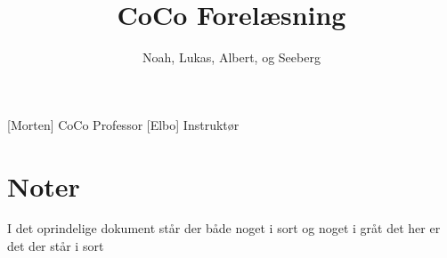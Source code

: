 \documentclass[a4paper,11pt]{article}
\title{CoCo Forelæsning}
\author{Noah, Lukas, Albert, og Seeberg}
\begin{document}
\maketitle

\begin{roles}
[Morten] CoCo Professor
[Elbo] Instruktør
\end{roles} 

\section*{Noter}
I det oprindelige dokument står der både noget i sort og noget i gråt det her er det der står i sort

\begin{props}
\prop{}
\prop{}
\prop{}
\prop{}
\prop{}
\prop{}
\end{props}
\end{document}
